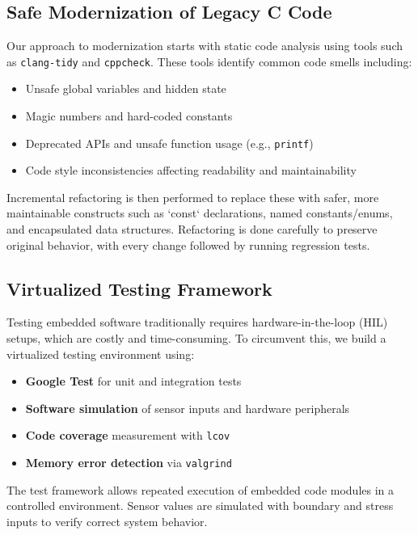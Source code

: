 \documentclass[conference]{IEEEtran}
\begin{document}
	\subsection{Safe Modernization of Legacy C Code}
	Our approach to modernization starts with static code analysis using tools such as \texttt{clang-tidy} and \texttt{cppcheck}. These tools identify common code smells including:
	
	\begin{itemize}
		\item Unsafe global variables and hidden state
		\item Magic numbers and hard-coded constants
		\item Deprecated APIs and unsafe function usage (e.g., \texttt{printf})
		\item Code style inconsistencies affecting readability and maintainability
	\end{itemize}
	
	Incremental refactoring is then performed to replace these with safer, more maintainable constructs such as `const` declarations, named constants/enums, and encapsulated data structures. Refactoring is done carefully to preserve original behavior, with every change followed by running regression tests.
	
	\subsection{Virtualized Testing Framework}
	Testing embedded software traditionally requires hardware-in-the-loop (HIL) setups, which are costly and time-consuming. To circumvent this, we build a virtualized testing environment using:
	
	\begin{itemize}
		\item \textbf{Google Test} for unit and integration tests \cite{googletest}
		\item \textbf{Software simulation} of sensor inputs and hardware peripherals
		\item \textbf{Code coverage} measurement with \texttt{lcov}
		\item \textbf{Memory error detection} via \texttt{valgrind}
	\end{itemize}
	
	The test framework allows repeated execution of embedded code modules in a controlled environment. Sensor values are simulated with boundary and stress inputs to verify correct system behavior.
	
\end{document}
